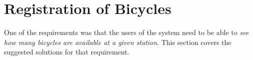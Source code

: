 \section{Registration of Bicycles}
One of the requirements was that the users of the system need to be able to \textit{see how many bicycles are available at a given station}.
This section covers the suggested solutions for that requirement.


